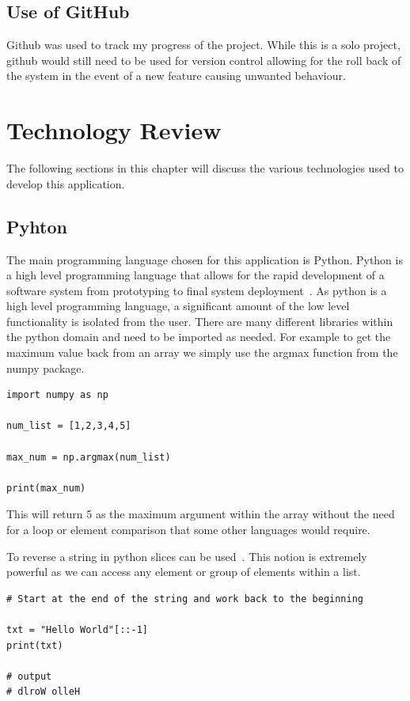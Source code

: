 \section{Use of GitHub}
Github was used to track my progress of the project. While this is a solo project, github would still need to be used for version control allowing for the roll back of the system in the event of a new feature causing unwanted behaviour.




\chapter{Technology Review}
The following sections in this chapter will discuss the various technologies used to develop this application.

\section{Pyhton}
The main programming language chosen for this application is Python.
Python is a high level programming language that allows for the rapid development of a software system from prototyping to final system deployment~\cite{Welcomet74:online}. As python is a high level programming language, a significant amount of the low level functionality is isolated from the user. There are many different libraries within the python domain and need to be imported as needed. For example to get the maximum value back from an array we simply use the argmax function from the numpy package. 
\begin{verbatim}
import numpy as np

num_list = [1,2,3,4,5]

max_num = np.argmax(num_list)

print(max_num)
\end{verbatim}

This will return 5 as the maximum argument within the array without the need for a loop or element comparison that some other languages would require.

To reverse a string in python slices can be used~\cite{TryitEdi9:online}.
This notion is extremely powerful as we can access any element or group of elements within a list.

\begin{verbatim}
# Start at the end of the string and work back to the beginning

txt = "Hello World"[::-1]
print(txt)

# output
# dlroW olleH
\end{verbatim}


